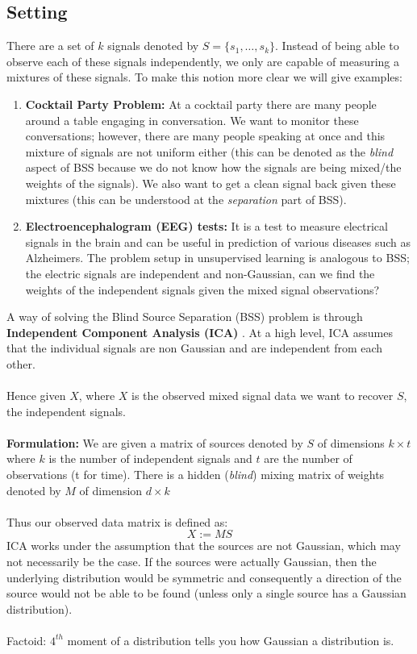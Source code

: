 \subsection{Setting}

There are a set of $k$ signals denoted by $S = \{ s_1, \dots, s_k\}$. Instead of being able to observe 
each of these signals independently, we only are capable of measuring a mixtures of these signals. To make
this notion more clear we will give examples: 
\begin{enumerate}
    \item \textbf{Cocktail Party Problem:} At a cocktail party there are many people around a table
    engaging in conversation. We want to monitor these conversations; however, there are many people
    speaking at once and this mixture of signals are not uniform either (this can be denoted as the
    \textit{blind} aspect of BSS because we do not know how the signals are being mixed/the weights of the
    signals). We also want to get a clean signal back given these mixtures (this can be understood at the
    \textit{separation} part of BSS).  
    \item \textbf{Electroencephalogram (EEG) tests:} It is a test to measure electrical signals in the brain and can be useful in prediction of various diseases such as Alzheimers. The problem setup in unsupervised learning is analogous to BSS; the electric signals are independent and non-Gaussian, can we find the weights of the independent signals given the mixed signal observations? 
\end{enumerate}
A way of solving the Blind Source Separation (BSS) problem is through \textbf{Independent Component Analysis (ICA) }. At a high level, ICA assumes that the individual signals are non Gaussian and are independent from each other. \\ \\
Hence given $X$, where $X$ is the observed mixed signal data we want to recover $S$, the independent signals. \\ \\
\textbf{Formulation: } We are given a matrix of sources denoted by $S$ of dimensions $k \times t$ where $k$ is the number of independent signals and $t$ are the number of observations (t for time). There is a hidden (\textit{blind}) mixing matrix of weights denoted by $M$ of dimension $d \times k$ \\ \\ 
Thus our observed data matrix is defined as: \[ X := MS \]
ICA works under the assumption that the sources are not Gaussian, which may not necessarily be the case. If the sources were actually Gaussian, then the underlying distribution would be symmetric and consequently a direction of the source would not be able to be found (unless only a single source has a Gaussian distribution).  \\ \\
Factoid: $4^{th}$ moment of a distribution tells you how Gaussian a distribution is. 

